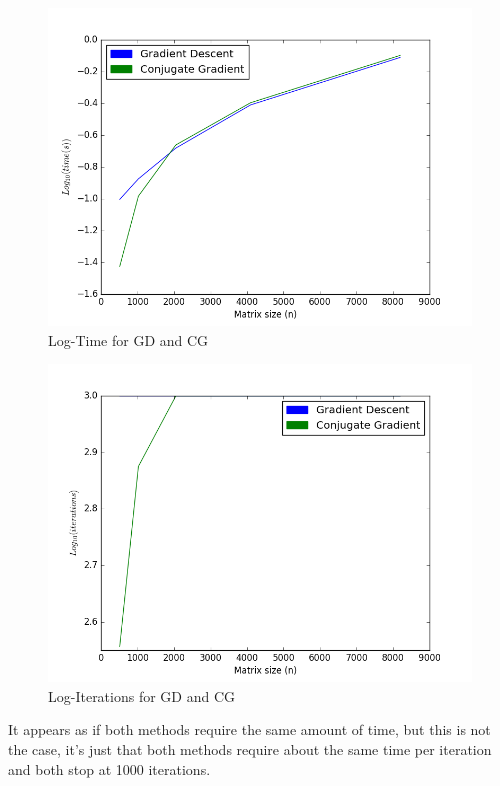 \documentclass[a4paper]{article}
\begin{document}
\begin{figure}[H]
	\centering
	\includegraphics[width=1\textwidth]{2logtime1000.png}
	\caption{Log-Time for GD and CG}
	\label{fig:logtimegdcg1000}
\end{figure}

\begin{figure}[H]
	\centering
	\includegraphics[width=1\textwidth]{2logiterations1000.png}
	\caption{Log-Iterations for GD and CG}
	\label{fig:logitgdcg1000}
\end{figure}

It appears as if both methods require the same amount of time, but this is not the case, it's just that both methods require about the same time per iteration and both stop at 1000 iterations.
\end{document}
